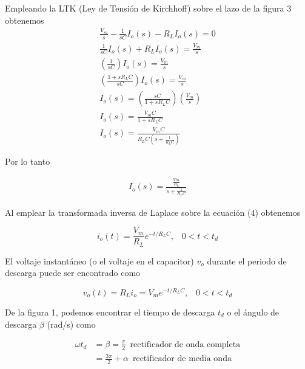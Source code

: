\documentclass[12pt,a4paper]{article}
\begin{document}
	\newpage
	Empleando la LTK (Ley de Tensión de Kirchhoff) sobre el lazo de la figura 3	obtenemos
	\begin{subequations}
		\begin{align}
			\frac{V_m}{s} - \frac{1}{sC}I_o(s) - R_LI_o(s) = 0\nonumber\\
			\frac{1}{sC}I_o(s) + R_LI_o(s) = \frac{V_m}{s}\nonumber\\
			\left( \frac{1}{sC} \right) I_o(s) = \frac{V_m}{s}\nonumber\\
			\left( \frac{1 +sR_LC}{sC} \right) I_o(s) =  \frac{V_m}{s}\nonumber\\
			I_o(s) = \left( \frac{sC}{1 + sR_LC} \right) \left( \frac{V_m}{s} \right)\nonumber\\
			I_o(s) = \frac{V_m C}{1 + sR_LC}\nonumber\\
			I_o(s) = \frac{V_m C}{R_LC \left( s + \frac{1}{R_LC} \right)} \nonumber
		\end{align}	
	\end{subequations}
	
	Por lo tanto
	
	\begin{align}
		I_o(s) = \frac{ \frac{Vm}{R_L}}{s + \frac{1}{R_LC}}
	\end{align}

	Al emplear la transformada inversa de Laplace sobre la ecuación (4) obtenemos
	\begin{tcolorbox}[colback=red!5!white,colframe=red!75!black,width=(\linewidth+0.45cm)]
		\begin{equation}
			i_o(t) = \frac{V_m}{R_L}e^{-t/R_LC}, \,\,\,\,\, 0<t<t_d
		\end{equation}
	\end{tcolorbox}

	El voltaje instantáneo (o el voltaje en el capacitor) $v_o$ durante el periodo de descarga puede ser encontrado como
	\begin{tcolorbox}[colback=red!5!white,colframe=red!75!black,width=(\linewidth+0.45cm)]
		\begin{equation}
			v_o(t) = R_Li_o = V_m e^{-t/R_LC}, \,\,\,\,\, 0<t<t_d
		\end{equation}
	\end{tcolorbox}
	
	De la figura 1, podemos encontrar el tiempo de descarga $t_d$ o el ángulo de descarga $\beta$ (rad/s) como
	
	\begin{subequations}
		\begin{align}
		\omega t_d &= \beta = \frac{\pi}{2}\,\,\, \text{rectificador de onda completa} \\
		&= \frac{3\pi}{2} + \alpha\,\,\, \text{rectificador de media onda}
	\end{align}
	\end{subequations}
\end{document}
